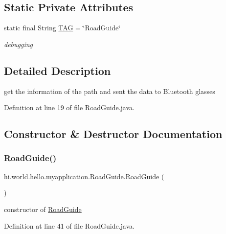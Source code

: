 \subsection*{Static Private Attributes}
\begin{DoxyCompactItemize}
\item 
static final String \mbox{\hyperlink{classhi_1_1world_1_1hello_1_1myapplication_1_1_road_guide_a509b589225474dfb7864262b59a73019}{T\+AG}} = \char`\"{}Road\+Guide\char`\"{}
\begin{DoxyCompactList}\small\item\em debugging \end{DoxyCompactList}\end{DoxyCompactItemize}


\subsection{Detailed Description}
get the information of the path and sent the data to Bluetooth glasses 

Definition at line 19 of file Road\+Guide.\+java.



\subsection{Constructor \& Destructor Documentation}
\mbox{\label{classhi_1_1world_1_1hello_1_1myapplication_1_1_road_guide_a26bab1e856c7986a35531692d9d84f4e}} 
\subsubsection{\texorpdfstring{RoadGuide()}{RoadGuide()}}
{\footnotesize\ttfamily hi.\+world.\+hello.\+myapplication.\+Road\+Guide.\+Road\+Guide (\begin{DoxyParamCaption}{ }\end{DoxyParamCaption})}



constructor of \mbox{\hyperlink{classhi_1_1world_1_1hello_1_1myapplication_1_1_road_guide}{Road\+Guide}} 



Definition at line 41 of file Road\+Guide.\+java.


